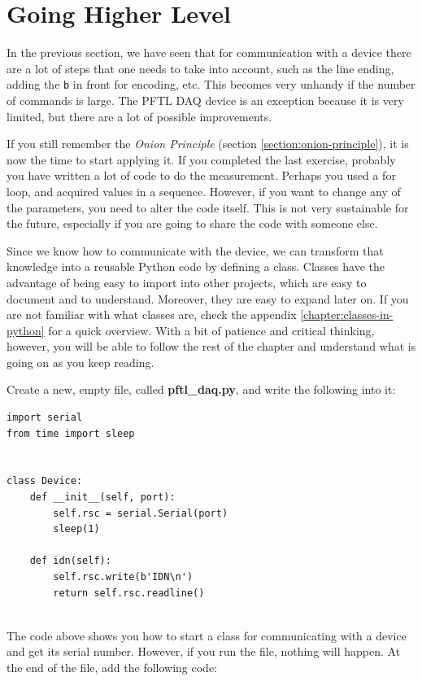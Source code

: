 \section{Going Higher Level}\label{section:going-higherlevel}
In the previous section, we have seen that for communication with a device there are a lot of steps that one needs to take into account, such as the
line ending, adding the \texttt{b} in front for encoding, etc. This becomes very unhandy if the number of commands is large. The {PFTL DAQ} device is an exception because it is very limited, but there are a lot of possible improvements. 

If you still remember the \emph{Onion Principle} (section \ref{section:onion-principle}), it is now the time to start applying it. If you completed the last exercise, probably you have written a lot of code to do the measurement. Perhaps you used a for loop, and acquired values in a sequence. However, if you want to change any of the parameters, you need to alter the code itself. This is not very sustainable for the future, especially if you are going to share the code with someone else. 

Since we know how to communicate with the device, we can transform that knowledge into a reusable Python code by defining a class. Classes have the advantage of being easy to import into other projects, which are easy to document and to understand. Moreover, they are easy to expand later on. If you are not familiar with what classes are, check the appendix \ref{chapter:classes-in-python} for a quick overview. With a bit of patience and critical thinking, however, you will be able to follow the rest of the chapter and understand what is going on as you keep reading. 

Create a new, empty file, called \textbf{pftl\_daq.py}, and write the following into it:

\begin{verbatim}
import serial
from time import sleep


class Device:
    def __init__(self, port):
        self.rsc = serial.Serial(port)
        sleep(1)

    def idn(self):
        self.rsc.write(b'IDN\n')
        return self.rsc.readline()
        
\end{verbatim}

The code above shows you how to start a class for communicating with a device and get its serial number. However, if you run the file, nothing will happen. At the end of the file, add the following code: 

